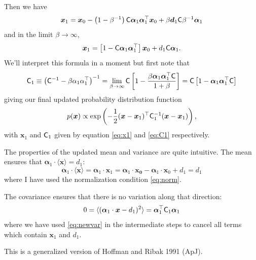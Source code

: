 \documentclass[11pt,a4paper,preprint]{aastex}
\newcommand{\bmath}[1]{\ensuremath{\bm{#1}}}
\renewcommand{\vec}[1]{\bmath{#1}}
\newcommand{\tens}[1]{{\bf \sf #1}}
\begin{document}
Then we have
\begin{equation}
\vec{x}_1 = \vec{x}_0 - \left(1-\beta^{-1}\right) \tens{C}
\vec{\alpha}_1 \vec{\alpha}_1^{\top} \vec{x}_0 + \beta \vec{d}_1
\tens{C} \beta^{-1} \vec{\alpha}_1
\end{equation}
and in the limit $\beta \to \infty$,
\begin{equation}
\vec{x}_1 = \left[1-\tens{C} \vec{\alpha}_1 \vec{\alpha}_1^{\top}
\right] \vec{x}_0 + d_1 \tens{C} \vec{\alpha}_1\textrm{.}\label{eq:x1}
\end{equation}
We'll interpret this formula in a moment but first note that 
\begin{equation}
\tens{C}_1 \equiv \left(\tens{C}^{-1} - \beta \alpha_1
  \alpha_1^{\top}\right)^{-1} = \lim_{\beta \to \infty} \tens{C}
\left[1-\frac{\beta \vec{\alpha}_1 \vec{\alpha}_1^{\top}
    \tens{C}}{1+\beta} \right] = \tens{C}
\left[1- \vec{\alpha}_1 \vec{\alpha}_1^{\top}
    \tens{C} \right]\label{eq:C1}
\end{equation}
giving our final updated probability distribution function
\begin{equation}
p(\vec{x}) \propto \exp \left(-\frac{1}{2} (\vec{x} -
  \vec{x}_1)^{\top} \tens{C}_1^{-1} (\vec{x}-\vec{x}_1) \right)\textrm{,}
\end{equation}
with $\vec{x}_1$ and $\tens{C}_1$ given by equation \eqref{eq:x1} and
\eqref{eq:C1} respectively.

The properties of the updated mean and variance are quite
intuitive. The mean ensures that $\vec{\alpha}_1 \cdot \langle \vec{x}
\rangle = d_1$:
\begin{equation}
\vec{\alpha}_1 \cdot \langle \vec{x} \rangle = \vec{\alpha}_1 \cdot
\vec{x}_1 = \vec{\alpha}_1 \cdot \vec{x_0} - \vec{\alpha}_1 \cdot
\vec{x}_0 + d_1 = d_1
\label{eq:newvar}
\end{equation}
where I have used the normalization condition \eqref{eq:norm}.

The covariance ensures that there is no variation along that
direction:
\begin{equation}
0=\langle (\vec{\alpha}_1 \cdot \vec{x}-d_1)^2 \rangle =%
\vec{\alpha}_1^{\top}\tens{C}_1 \vec{\alpha}_1 %
\end{equation}
where we have used \eqref{eq:newvar} in the intermediate steps to cancel all terms which contain $\vec{x}_1$ and $d_1$.

This is a generalized version of Hoffman and Ribak 1991 (ApJ).
\end{document}
